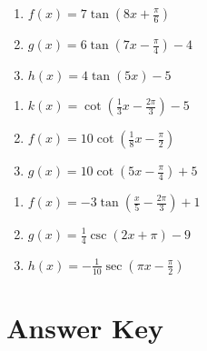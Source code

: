 \smallskip
\begin{multicols}{3}
\begin{enumerate}	\setcounter{enumi}{\value{Review}}
	\item $f(x) = 7\tan\left(8x+\frac{\pi}{6}\right)$
	\item $g(x) = 6\tan\left(7x-\frac{\pi}{4}\right)-4$
	\item $h(x) = 4\tan(5x)-5$
\end{enumerate}	\setcounter{Review}{\value{enumi}}
\end{multicols}
\smallskip
\begin{multicols}{3}
\begin{enumerate}	\setcounter{enumi}{\value{Review}}
	\item $k(x) = \cot\left(\frac{1}{3}x-\frac{2\pi}{3}\right)-5$
	\item $f(x) = 10\cot\left(\frac{1}{8}x-\frac{\pi}{2}\right)$
	\item $g(x) = 10\cot\left(5x-\frac{\pi}{4}\right)+5$
\end{enumerate}	\setcounter{Review}{\value{enumi}}
\end{multicols}
\smallskip
\begin{multicols}{3}
\begin{enumerate}	\setcounter{enumi}{\value{Review}}
\item $f(x) = -3\tan\left(\frac{x}{5}-\frac{2\pi}{3}\right) + 1$
\item $g(x) = \frac{1}{4}\csc\left(2x+\pi\right) - 9$
\item $h(x) = -\frac{1}{10}\sec\left(\pi x - \frac{\pi}{2}\right)$
\end{enumerate}	
\end{multicols}
\smallskip

\newpage

\section{Answer Key}

